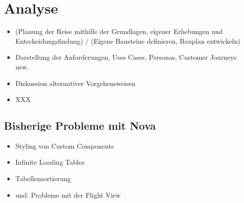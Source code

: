 \section{Analyse}
\begin{itemize}
    \item (Planung der Reise mithilfe der Grundlagen, eigener Erhebungen und Entscheidungsfindung) / (Eigene Bausteine definieren, Bauplan entwickeln)
    \item Darstellung der Anforderungen, Uses Cases, Personas, Customer Journeys usw.
    \item Diskussion alternativer Vorgehensweisen
    \item XXX
\end{itemize}

\subsection{Bisherige Probleme mit Nova}
\begin{itemize}
    \item Styling von Custom Components
    \item Infinite Loading Tables
    \item Tabellensortierung
    \item und: Probleme mit der Flight View
\end{itemize}
